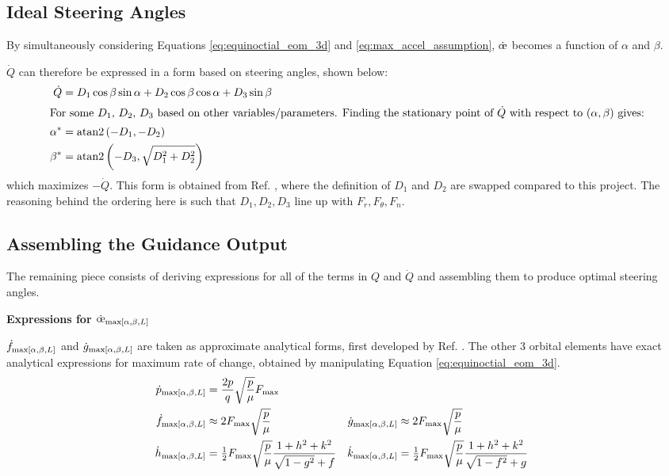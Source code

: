 \subsection{Ideal Steering Angles}
By simultaneously considering Equations \ref{eq:equinoctial_eom_3d} and \ref{eq:max_accel_assumption}, $\dot{\moe}$ becomes a function of $\alpha$ and $\beta$.

$\dot{Q}$ can therefore be expressed in a form based on steering angles, shown below:
\begin{align}
  \dot{Q}  & = D_1 \cos \beta \sin \alpha + D_2 \cos \beta \cos \alpha + D_3 \sin \beta \label{eq:q_dot_angles_form} \\
  \intertext{For some $D_1$, $D_2$, $D_3$ based on other variables/parameters. Finding the stationary point of $\dot{Q}$ with respect to $(\alpha, \beta)$ gives:}
  \alpha^* & = \mathrm{atan2}\left(-D_1, -D_2\right) \label{eq:alpha_star}                                           \\
  \beta^*  & = \mathrm{atan2}\left(-D_3, \sqrt{D_1^2 + D_2^2}\right) \label{eq:beta_star}
\end{align}
which maximizes $-\dot{Q}$. This form is obtained from Ref. \cite{vargaperez2016}, where the definition of $D_1$ and $D_2$ are swapped compared to this project. The reasoning behind the ordering here is such that $D_1, D_2, D_3$ line up with $F_r, F_\theta, F_n$.

\subsection{Assembling the Guidance Output}
The remaining piece consists of deriving expressions for all of the terms in $Q$ and $\dot{Q}$ and assembling them to produce optimal steering angles.

\textbf{Expressions for $\dot{\moe}_{\maxrocall}$}

$\dot{f}_{\text{max}[\alpha, \beta, L]}$ and $\dot{g}_{\text{max}[\alpha, \beta, L]}$ are taken as approximate analytical forms, first developed by Ref. \cite{vargaperez2016}. The other 3 orbital elements have exact analytical expressions for maximum rate of change, obtained by manipulating Equation \ref{eq:equinoctial_eom_3d}.
\begin{align*}
  \dot{p}_{\text{max}[\alpha, \beta, L]} & = \frac{2p}{q} \sqrt{\frac{p}{\mu}} F_{\max}                                   \\
  \dot{f}_{\text{max}[\alpha, \beta, L]} & \approx 2F_{\max} \sqrt{\frac{p}{\mu}}                                       &
  \dot{g}_{\text{max}[\alpha, \beta, L]} & \approx 2F_{\max} \sqrt{\frac{p}{\mu}}                                         \\
  \dot{h}_{\text{max}[\alpha, \beta, L]} & = \tfrac{1}{2}F_{\max} \sqrt{\frac{p}{\mu}} \frac{1+h^2+k^2}{\sqrt{1-g^2}+f} &
  \dot{k}_{\text{max}[\alpha, \beta, L]} & = \tfrac{1}{2}F_{\max} \sqrt{\frac{p}{\mu}}\frac{1+h^2+k^2}{\sqrt{1-f^2}+g}
\end{align*}


